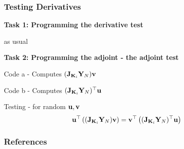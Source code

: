 \documentclass[12pt,fleqn,handout]{beamer}
\begin{document}
\begin{frame}[fragile]\frametitle{Testing Derivatives}

{\bf Task 1: Programming the derivative test}

as usual


{\bf Task 2: Programming the adjoint - the adjoint test}

Code a - Computes $({\bf J}_{{\bf K}_i}{\bf Y}_N){\bf v}$

Code b - Computes $({\bf J}_{{\bf K}_i}{\bf Y}_N)^{\top}{\bf u}$

\bigskip

Testing - for random ${\bf u},{\bf v}$
$$ {\bf u}^{\top} \left(({\bf J}_{{\bf K}_i}{\bf Y}_N){\bf v} \right) = {\bf v}^{\top} \left(({\bf J}_{{\bf K}_i}{\bf Y}_N)^{\top}{\bf u} \right)
$$

\end{frame}

\begin{frame}[allowframebreaks]
	\frametitle{References}



\end{frame}
\end{document}
